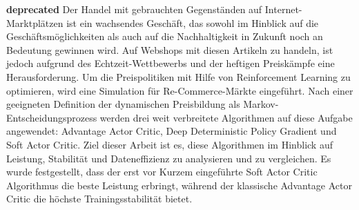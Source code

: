 \textbf{deprecated}
Der Handel mit gebrauchten Gegenständen auf Internet-Marktplätzen ist ein wachsendes Geschäft, das sowohl im Hinblick auf die Geschäftsmöglichkeiten als auch auf die Nachhaltigkeit in Zukunft noch an Bedeutung gewinnen wird.
Auf Webshops mit diesen Artikeln zu handeln, ist jedoch aufgrund des Echtzeit-Wettbewerbs und der heftigen Preiskämpfe eine Herausforderung.
Um die Preispolitiken mit Hilfe von Reinforcement Learning zu optimieren, wird eine Simulation für Re-Commerce-Märkte eingeführt.
Nach einer geeigneten Definition der dynamischen Preisbildung als Markov-Entscheidungsprozess werden drei weit verbreitete Algorithmen auf diese Aufgabe angewendet:
Advantage Actor Critic, Deep Deterministic Policy Gradient und Soft Actor Critic.
Ziel dieser Arbeit ist es, diese Algorithmen im Hinblick auf Leistung, Stabilität und Dateneffizienz zu analysieren und zu vergleichen.
Es wurde festgestellt, dass der erst vor Kurzem eingeführte Soft Actor Critic Algorithmus die beste Leistung erbringt, während der klassische Advantage Actor Critic die höchste Trainingsstabilität bietet.
